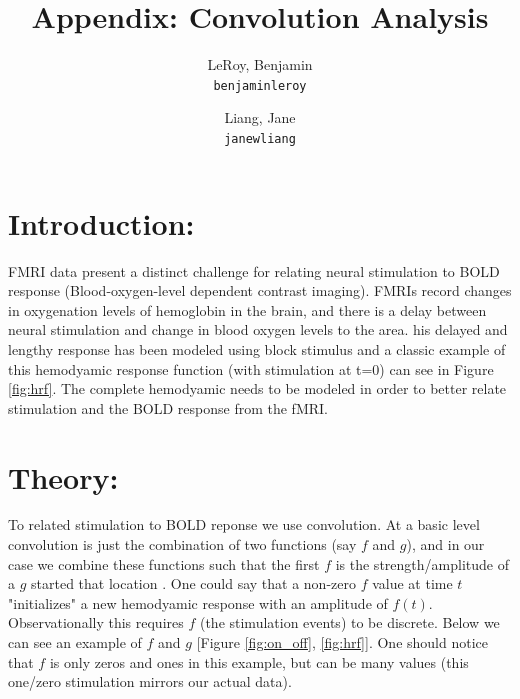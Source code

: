 \documentclass[11pt]{article}
\title{Appendix: Convolution Analysis}
\author{
  LeRoy, Benjamin\\
  \texttt{benjaminleroy}
  \and
  Liang, Jane\\
  \texttt{janewliang}
}
\begin{document}
\maketitle


\section{Introduction:}

FMRI data present a distinct challenge for relating neural stimulation to BOLD response  (Blood-oxygen-level dependent contrast imaging). FMRIs record changes in oxygenation levels of hemoglobin in the brain, and there is a delay between neural stimulation and change in blood oxygen levels to the area. his delayed and lengthy response has been modeled using block stimulus and a classic example of this hemodyamic response function (with stimulation at t=0) can see in Figure \ref{fig:hrf}.  The complete hemodyamic needs to be modeled in order to better relate  stimulation and the BOLD response from the fMRI.

\section{Theory:}

To related stimulation to BOLD reponse we use convolution. At a basic level convolution is just the combination of two functions (say $f$ and $g$), and in our case we combine these functions such that the first $f$ is the strength/amplitude of a $g$ started that location \cite{brett2015course}. One could say that a non-zero $f$ value at time $t$  "initializes" a new hemodyamic response with an amplitude of $f(t)$.  Observationally this requires $f$ (the stimulation events) to be discrete. Below we can see an example of $f$ and $g$ [Figure \ref{fig:on_off}, \ref{fig:hrf}]. One should notice that $f$ is only zeros and ones in this example, but can be many values (this one/zero stimulation mirrors our actual data).
\end{document}
